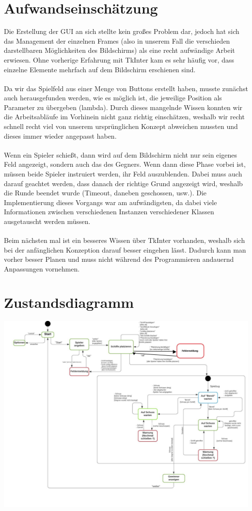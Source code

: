 \documentclass[11pt,a4paper]{article}
\begin{document}
\section*{Aufwandseinschätzung}
Die Erstellung der GUI an sich stellte kein großes Problem dar, jedoch hat sich das Management der einzelnen Frames (also in unserem Fall die verschieden darstellbaren Möglichkeiten des Bildschirms) als eine recht aufwändige Arbeit erwiesen. Ohne vorherige Erfahrung mit TkInter kam es sehr häufig vor, dass einzelne Elemente mehrfach auf dem Bildschirm erschienen sind.\\\\
Da wir das Spielfeld aus einer Menge von Buttons erstellt haben, musste zunächst auch herausgefunden werden, wie es möglich ist, die jeweilige Position als Parameter zu übergeben (lambda). Durch dieses mangelnde Wissen konnten wir die Arbeitsabläufe im Vorhinein nicht ganz richtig einschätzen, weshalb wir recht schnell recht viel von unserem ursprünglichen Konzept abweichen mussten und dieses immer wieder angepasst haben.\\\\
Wenn ein Spieler schießt, dann wird auf dem Bildschirm nicht nur sein eigenes Feld angezeigt, sondern auch das des Gegners. Wenn dann diese Phase vorbei ist, müssen beide Spieler instruiert werden, ihr Feld auszublenden. Dabei muss auch darauf geachtet werden, dass danach der richtige Grund angezeigt wird, weshalb die Runde beendet wurde (Timeout, daneben geschossen, usw.). Die Implementierung dieses Vorgangs war am aufwändigsten, da dabei viele Informationen zwischen verschiedenen Instanzen verschiedener Klassen ausgetauscht werden müssen.\\\\
Beim nächsten mal ist ein besseres Wissen über TkInter vorhanden, weshalb sich bei der anfänglichen Konzeption darauf besser eingehen lässt. Dadurch kann man vorher besser Planen und muss nicht während des Programmieren andauernd Anpassungen vornehmen.

\section*{Zustandsdiagramm}
\includegraphics[width=17cm]{uml.jpg}
\end{document}
